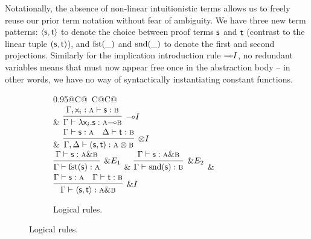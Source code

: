 Notationally, the absence of non-linear intuitionistic terms allows us to freely reuse our prior term notation without fear of ambiguity.
We have three new term patterns: $\langle \mathsf{s}, \mathsf{t} \rangle$ to denote the choice between proof terms $\mathsf{s}$ and $\mathsf{t}$ (contrast to the linear tuple $(\mathsf{s}, \mathsf{t})$), and $\textrm{fst}(\_)$ and $\textrm{snd}(\_)$ to denote the first and second projections.
Similarly for the implication introduction rule $\li I$, no redundant variables means that \smallterm{\vari } must now appear free once in the abstraction body  -- in other words, we have no way of syntactically instantiating constant functions.

\begin{figure}
	\centering
	\begin{subfigure}{1\textwidth}
		\centering
		\begin{tabularx}{0.95\textwidth}{@{}C@{~}C@{\qquad}C@{}}
		\\[2em]
		& 
		$\infer[\li I]{\Gamma \vdash \term{\lam \vari .s}: \prop{a} \li \prop{b}}{\Gamma, \term{\vari }: \prop{a} \vdash \term{s}: \prop{b}}$\\[\smallsep]
		&
		$\infer[\otimes I]{\Gamma, \Delta \vdash (\term{s}, \term{t}): \prop{a} \otimes \prop{b}}{\Gamma \vdash \term{s}: \prop{a} & \Delta \vdash \term{t}: \prop{b}}$\\[\smallsep]
		$
		\infer[\with E_1]{\Gamma \vdash \cterm{fst(\smallterm{s})}: \prop{a}}{\Gamma \vdash \smallterm{s}: \prop{a} \with \prop{b}}
		$
		&
		$
		\infer[\with E_2]{\Gamma \vdash \cterm{snd(\smallterm{s})}: \prop{b}}{\Gamma \vdash \term{s}: \prop{a} \with \prop{b}}
		$
		&
		$
		\infer[\with I]{\Gamma \vdash \langle\term{s}, \term{t}\rangle: \prop{a} \with \prop{b}}{\Gamma \vdash \term{s}: \prop{a} & \Gamma \vdash \term{t}: \prop{b}}
		$
		\end{tabularx}
		\caption{Logical rules.}
		\label{subfigure:linear_logic_rules:logical}

\end{subfigure}
\end{figure}
